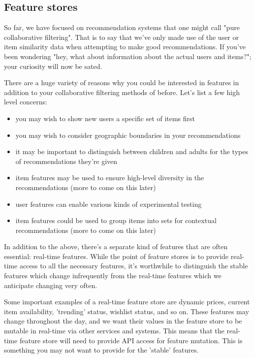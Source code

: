 \subsection{Feature stores}

So far, we have focused on recommendation systems that one might call "pure collaborative filtering". That is to say that we've only made use of the user or item similarity data when attempting to make good recommendations. If you've been wondering "hey, what about information about the actual users and items?"; your curiosity will now be sated. 

There are a huge variety of reasons why you could be interested in features in addition to your collaborative filtering methods of before. Let's list a few high level concerns:

\begin{itemize}
\item you may wish to show new users a specific set of items first
\item you may wish to consider geographic boundaries in your recommendations
\item it may be important to distinguish between children and adults for the types of recommendations they're given
\item item features may be used to ensure high-level diversity in the recommendations (more to come on this later)
\item user features can enable various kinds of experimental testing
\item item features could be used to group items into sets for contextual recommendations (more to come on this later)
\end{itemize}

In addition to the above, there's a separate kind of features that are often essential: real-time features. While the point of feature stores is to provide real-time access to all the necessary features, it's worthwhile to distinguish the stable features which change infrequently from the real-time features which we anticipate changing very often. 

Some important examples of a real-time feature store are dynamic prices, current item availability, 'trending' status, wishlist status, and so on. These features may change throughout the day, and we want their values in the feature store to be mutable in real-time via other services and systems. This means that the real-time feature store will need to provide API access for feature mutation. This is something you may not want to provide for the 'stable' features.

